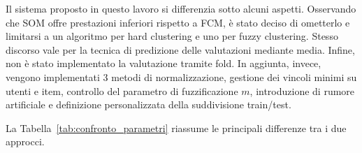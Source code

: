 Il sistema proposto in questo lavoro si differenzia sotto alcuni aspetti. Osservando che SOM offre prestazioni inferiori rispetto a FCM, è stato deciso di ometterlo e limitarsi a un algoritmo per hard clustering e uno per fuzzy clustering. Stesso discorso vale per la tecnica di predizione delle valutazioni mediante media. Infine, non è stato implementato la valutazione tramite fold. In aggiunta, invece, vengono implementati 3 metodi di normalizzazione, gestione dei vincoli minimi su utenti e item, controllo del parametro di fuzzificazione \( m \), introduzione di rumore artificiale e definizione personalizzata della suddivisione train/test.

La Tabella~\ref{tab:confronto_parametri} riassume le principali differenze tra i due approcci.

\begin{table}[H]
\centering
\caption{Confronto dei parametri sperimentali tra questo lavoro e Koohi \& Kiani (2016)}
\end{table}

